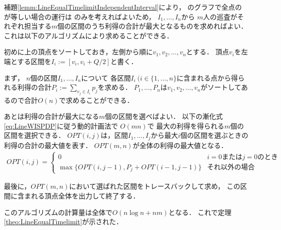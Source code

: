 補題\ref{lemm:LineEqualTimelimitIndependentInterval}により，
{\graphLine}のグラフで全点の{\maxIdletime}が等しい場合の運行は
{\indSectOperation}のみを考えればよいため，
$I_1, \ldots, I_n$から
$m$人の巡査がそれぞれ担当する$m$個の区間のうち利得の合計が最大となるものを求めればよい．
これは以下のアルゴリズムにより求めることができる．

初めに{\graphLine}上の頂点をソートしておき，左側から順に$v_1, v_2, \ldots, v_n$とする．
頂点$v_i$を左端とする区間を$I_i := [v_i, v_i + Q/2]$と書く．

まず，
$n$個の区間$I_1, \ldots, I_n$について
各区間$I_i\ (i \in \{ 1, \ldots, n \}$に含まれる点から得られる利得の合計$P_i := \sum_{v_j \in I_i} p_j$を求める．
$P_1, \ldots, P_n$は$v_1, v_2, \ldots, v_n$がソートしてあるので合計$O(n)$で求めることができる．

あとは利得の合計が最大になる$m$個の区間を選べばよい．
以下の漸化式\eqref{eq:LineWISPDP}に従う動的計画法で
$O(mn)$で
最大の利得を得られる$m$個の区間を選択できる．
$OPT(i,j)$は，区間$I_1, \ldots, I_j$から最大$i$個の区間を選ぶときの
利得の合計の最大値を表す．
$OPT(m,n)$が全体の利得の最大値となる．
\begin{align}
  \label{eq:LineWISPDP}
  OPT(i,j) = 
  \begin{cases}
    0 & \text{$i = 0$または$j = 0$のとき} \\
    \max \{
      OPT(i, j - 1), 
      P_j + OPT(i - 1, j - 1)
    \}
    & \text{それ以外の場合}
  \end{cases}
\end{align}

最後に，$OPT(m,n)$において選ばれた区間をトレースバックして求め，
この区間に含まれる頂点全体を出力して終了する．

このアルゴリズムの計算量は全体で$O(n \log n + nm)$となる．
これで定理\ref{theo:LineEqualTimelimit}が示された．


